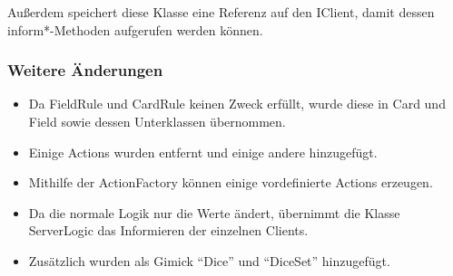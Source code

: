 \documentclass[a4paper,10pt]{article}
\begin{document}
Außerdem speichert diese Klasse eine Referenz auf den IClient, damit dessen inform*-Methoden aufgerufen werden können.

\subsubsection{Weitere Änderungen}
\begin{itemize}
\item Da FieldRule und CardRule keinen Zweck erfüllt, wurde diese in Card und Field sowie dessen Unterklassen übernommen.
\item Einige Actions wurden entfernt und einige andere hinzugefügt.
\item Mithilfe der ActionFactory können einige vordefinierte Actions erzeugen.
\item Da die normale Logik nur die Werte ändert, übernimmt die Klasse ServerLogic das Informieren der einzelnen Clients.
\item Zusätzlich wurden als Gimick ``Dice'' und ``DiceSet'' hinzugefügt.
\end{itemize}
\end{document}

